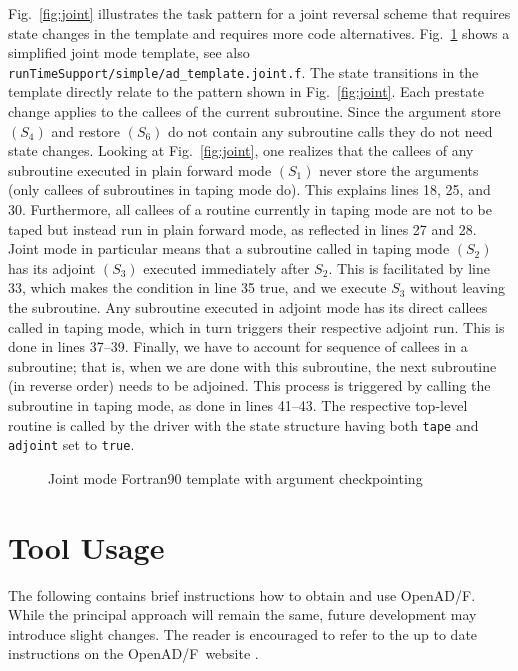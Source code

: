 \documentclass{book}
\newcommand{\OpenADF}{OpenAD/F}
\newcommand{\code}[1]{{\small\tt{#1}}}
\newcommand{\reffig}[1]{{Fig.~\ref{#1}}}
\begin{document}
\reffig{fig:joint} illustrates the task pattern for a joint reversal scheme that requires state changes 
in the template and requires more code alternatives. \reffig{fig:jointACTemplate} shows a 
simplified joint mode template, see also \code{runTimeSupport/simple/ad\_template.joint.f}. 
The state transitions in the template directly relate to the pattern 
shown in \reffig{fig:joint}. Each prestate change applies to the callees of the current 
subroutine. Since the argument store $(S_4)$ and restore $(S_6)$ do not contain any subroutine calls they 
do not need state changes. 
Looking at \reffig{fig:joint}, 
one realizes that the callees of 
any subroutine executed in plain forward mode $(S_1)$ 
never store the arguments (only callees of subroutines in 
taping mode do). 
This explains lines 18, 25, and 30. 
Furthermore, all callees of a routine currently in 
taping mode are not to be taped but instead run in plain forward mode, as reflected in lines 27 and 28. 
Joint mode in particular means that a subroutine called in taping mode $(S_2)$ has its adjoint $(S_3)$ executed immediately 
after $S_2$. 
This is facilitated by line 33, which makes the condition in line 35 true, and we execute 
$S_3$  without leaving the subroutine.  
Any subroutine executed in adjoint mode has its direct 
callees called in taping mode, which in turn triggers their respective adjoint run. This is done in 
lines 37--39.   
Finally, we have to account for sequence of callees in a subroutine; that is, when we are done with this subroutine, 
the next subroutine (in reverse order) needs to be adjoined. This process is triggered by calling the subroutine in taping mode, as done 
in lines 41--43. 
The respective top-level routine is called by the driver with the state structure having both {\tt tape} and 
{\tt adjoint} set to {\tt true}. 
\begin{figure}
\begin{center}
\vspace*{-1cm}
\begin{minipage}{.8\linewidth}
\fontsize{8pt}{9pt}
\end{minipage}
\end{center}
\caption{Joint mode Fortran90 template with argument checkpointing} \label{fig:jointACTemplate}
\end{figure}
 
\chapter{Tool Usage} \label{chap:Usage}
The following contains brief instructions how to obtain and use \OpenADF. 
While the principal approach will remain the same, future development may 
introduce slight changes. The reader is encouraged to refer to the 
up to date instructions on the \OpenADF\ website \cite{openadWeb}.
\end{document}
